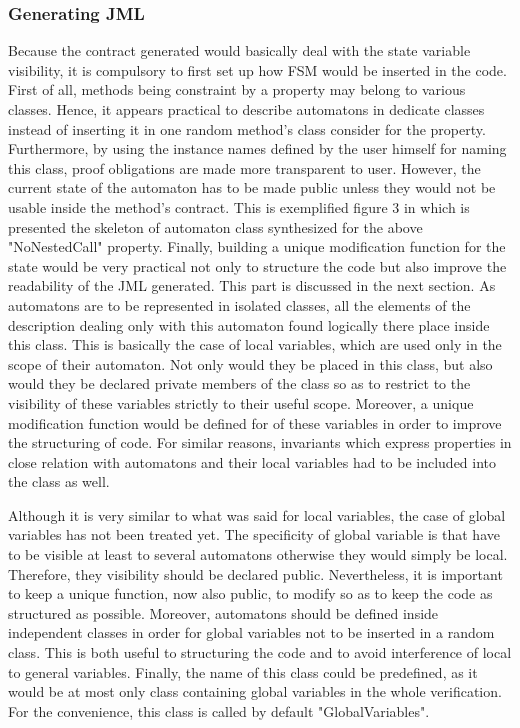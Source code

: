 \subsubsection{Generating JML}
Because the contract generated would basically deal with the state variable visibility, it is compulsory to first set up how FSM would be inserted in the code. First of all, methods being constraint by a property may belong to various classes. Hence, it appears practical to describe automatons in dedicate classes instead of inserting it in one random method's class consider for the property. Furthermore, by using the instance names defined by the user himself for naming this class, proof obligations are made more transparent to user. However, the current state of the automaton has to be made public unless they would not be usable inside the method's contract. This is exemplified figure 3 in which is presented the skeleton of automaton class synthesized for the above "NoNestedCall" property. Finally, building a unique modification function for the state would be very practical not only to structure the code but also improve the readability of the JML generated. This part is discussed in the next section.
As automatons are to be represented in isolated classes, all the elements of the description dealing only with this automaton found logically there place inside this class. This is basically the case of local variables, which are used only in the scope of their automaton. Not only would they be placed in this class, but also would they be declared private members of the class so as to restrict to the visibility of these variables strictly to their useful scope. Moreover, a unique modification function would be defined for of these variables in order to improve the structuring of code. For similar reasons, invariants which express properties in close relation with automatons and their local variables had to be included into the class as well. 

Although it is very similar to what was said for local variables, the case of global variables has not been treated yet. The specificity of global variable is that have to be visible at least to several automatons otherwise they would simply be local. Therefore, they visibility should be declared public. Nevertheless, it is important to keep a unique function, now also public, to modify so as to keep the code as structured as possible. Moreover, automatons should be defined inside independent classes in order for global variables not to be inserted in a random class. This is both useful to structuring the code and to avoid interference of local to general variables. Finally, the name of this class could be predefined, as it would be at most only class containing global variables in the whole verification. For the convenience, this class is called by default "GlobalVariables". 

